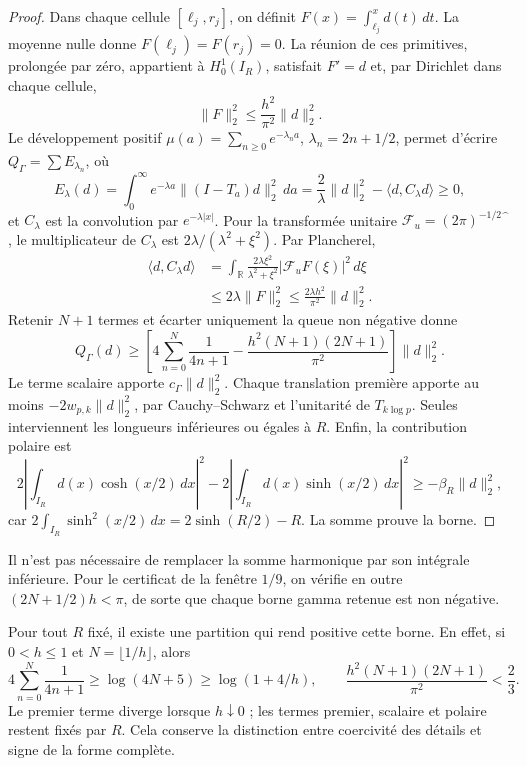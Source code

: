 \begin{proof}
Dans chaque cellule \([\ell_j,r_j]\), on définit
\(F(x)=\int_{\ell_j}^x d(t)\,dt\). La moyenne nulle donne
\(F(\ell_j)=F(r_j)=0\). La réunion de ces primitives, prolongée
par zéro, appartient à \(H_0^1(I_R)\), satisfait \(F'=d\) et, par
Dirichlet dans chaque cellule,
\begin{equation}
\|F\|_2^2\leq\frac{h^2}{\pi^2}\|d\|_2^2.
\label{schur-add-primitiva}
\end{equation}
Le développement positif
\(\mu(a)=\sum_{n\geq0}e^{-\lambda_n a}\), \(\lambda_n=2n+1/2\),
permet d'écrire \(Q_\Gamma=\sum E_{\lambda_n}\), où
\begin{equation}
E_\lambda(d)=\int_0^\infty e^{-\lambda a}
 \|(I-T_a)d\|_2^2\,da
 =\frac2\lambda\|d\|_2^2-\langle d,C_\lambda d\rangle\geq0,
\label{schur-add-energia-lambda}
\end{equation}
et \(C_\lambda\) est la convolution par \(e^{-\lambda|x|}\).
Pour la transformée unitaire
\(\mathcal F_u=(2\pi)^{-1/2}\widehat{\phantom f}\), le multiplicateur
de \(C_\lambda\) est \(2\lambda/(\lambda^2+\xi^2)\). Par Plancherel,
\begin{equation}
\begin{aligned}
\langle d,C_\lambda d\rangle
&=\int_{\mathbb R}\frac{2\lambda\xi^2}{\lambda^2+\xi^2}
 |\mathcal F_uF(\xi)|^2\,d\xi\\
&\leq2\lambda\|F\|_2^2
 \leq\frac{2\lambda h^2}{\pi^2}\|d\|_2^2 .
\end{aligned}
\label{schur-add-cota-convolucion}
\end{equation}
Retenir \(N+1\) termes et écarter uniquement la queue non négative donne
\[
Q_\Gamma(d)\geq
\left[4\sum_{n=0}^N\frac1{4n+1}
-\frac{h^2(N+1)(2N+1)}{\pi^2}\right]\|d\|_2^2.
\]
Le terme scalaire apporte \(c_\Gamma\|d\|_2^2\). Chaque translation première apporte au moins \(-2w_{p,k}\|d\|_2^2\), par Cauchy--Schwarz et l'unitarité de \(T_{k\log p}\). Seules interviennent les longueurs inférieures ou égales à \(R\). Enfin, la contribution polaire est
\[
2\left|\int_{I_R}d(x)\cosh(x/2)\,dx\right|^2
-2\left|\int_{I_R}d(x)\sinh(x/2)\,dx\right|^2
\geq-\beta_R\|d\|_2^2,
\]
car \(2\int_{I_R}\sinh^2(x/2)\,dx=2\sinh(R/2)-R\).
La somme prouve la borne.
\end{proof}
Il n'est pas nécessaire de remplacer la somme harmonique par son intégrale inférieure.
Pour le certificat de la fenêtre \(1/9\), on vérifie en outre
\((2N+1/2)h<\pi\), de sorte que chaque borne gamma retenue est non négative.

Pour tout \(R\) fixé, il existe une partition qui rend positive cette
borne. En effet, si \(0<h\leq1\) et \(N=\lfloor1/h\rfloor\), alors
\[
4\sum_{n=0}^N\frac1{4n+1}\geq\log(4N+5)\geq\log(1+4/h),
\qquad
\frac{h^2(N+1)(2N+1)}{\pi^2}<\frac23.
\]
Le premier terme diverge lorsque \(h\downarrow0\) ; les termes
premier, scalaire et polaire restent fixés par \(R\). Cela conserve
la distinction entre coercivité des détails et signe de la
forme complète.

